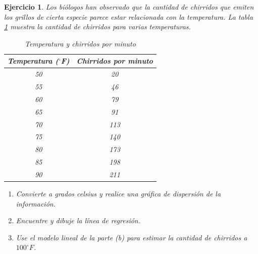 \documentclass[12pt,tikz,border=5pt]{article}
\newtheorem{ejercicio}{Ejercicio}[section]
\begin{document}
\begin{ejercicio}
  Los biólogos han observado que la cantidad de chirridos que emiten los grillos de cierta especie parece estar relacionada con la temperatura. La tabla \ref{tabla:tempChiPerMin} muestra la cantidad de chirridos para varias temperaturas.
  
\begin{table}[!h]
    \centering
    \begin{tabular}{cc}
        \toprule
        \textbf{Temperatura ($^\circ$F)} & \textbf{Chirridos por minuto} \\
        \midrule
        50 & 20 \\
        55 & 46 \\
        60 & 79 \\
        65 & 91 \\
        70 & 113 \\
        75 & 140 \\
        80 & 173 \\
        85 & 198 \\
        90 & 211 \\
        \bottomrule
    \end{tabular}
    \caption{Temperatura y chirridos por minuto}
    \label{tabla:tempChiPerMin}
\end{table}

\begin{enumerate}[label=(\alph*)]
  \item Convierte a grados celsius y realice una gráfica de dispersión de la información.
  \item Encuentre y dibuje la línea de regresión.
  \item Use el modelo lineal de la parte (b) para estimar la cantidad de chirridos a $100 ^{\circ}F$.
\end{enumerate}
\end{ejercicio}
\end{document}
